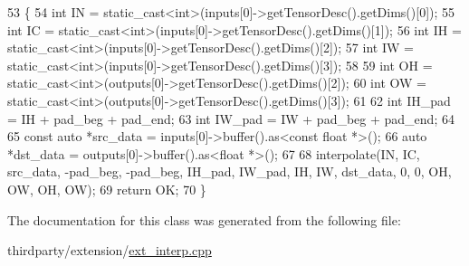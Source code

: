 \begin{DoxyCode}
53                                                              \{
54         \textcolor{keywordtype}{int} IN = \textcolor{keyword}{static\_cast<}\textcolor{keywordtype}{int}\textcolor{keyword}{>}(inputs[0]->getTensorDesc().getDims()[0]);
55         \textcolor{keywordtype}{int} IC = \textcolor{keyword}{static\_cast<}\textcolor{keywordtype}{int}\textcolor{keyword}{>}(inputs[0]->getTensorDesc().getDims()[1]);
56         \textcolor{keywordtype}{int} IH = \textcolor{keyword}{static\_cast<}\textcolor{keywordtype}{int}\textcolor{keyword}{>}(inputs[0]->getTensorDesc().getDims()[2]);
57         \textcolor{keywordtype}{int} IW = \textcolor{keyword}{static\_cast<}\textcolor{keywordtype}{int}\textcolor{keyword}{>}(inputs[0]->getTensorDesc().getDims()[3]);
58 
59         \textcolor{keywordtype}{int} OH = \textcolor{keyword}{static\_cast<}\textcolor{keywordtype}{int}\textcolor{keyword}{>}(outputs[0]->getTensorDesc().getDims()[2]);
60         \textcolor{keywordtype}{int} OW = \textcolor{keyword}{static\_cast<}\textcolor{keywordtype}{int}\textcolor{keyword}{>}(outputs[0]->getTensorDesc().getDims()[3]);
61 
62         \textcolor{keywordtype}{int} IH\_pad = IH + pad\_beg + pad\_end;
63         \textcolor{keywordtype}{int} IW\_pad = IW + pad\_beg + pad\_end;
64 
65         \textcolor{keyword}{const} \textcolor{keyword}{auto} *src\_data = inputs[0]->buffer().as<\textcolor{keyword}{const} \textcolor{keywordtype}{float} *>();
66         \textcolor{keyword}{auto} *dst\_data = outputs[0]->buffer().as<\textcolor{keywordtype}{float} *>();
67 
68         interpolate(IN, IC, src\_data, -pad\_beg, -pad\_beg, IH\_pad, IW\_pad, IH, IW, dst\_data, 0, 0, OH, OW, 
      OH, OW);
69         \textcolor{keywordflow}{return} OK;
70     \}
\end{DoxyCode}


The documentation for this class was generated from the following file\+:\begin{DoxyCompactItemize}
\item 
thirdparty/extension/\hyperlink{ext__interp_8cpp}{ext\+\_\+interp.\+cpp}\end{DoxyCompactItemize}
